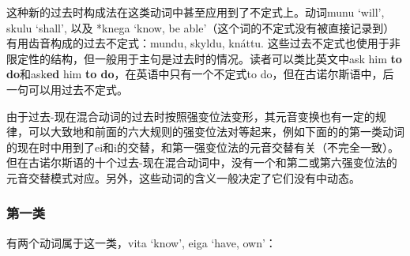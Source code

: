 这种新的过去时构成法在这类动词中甚至应用到了不定式上。动词munu `will‌', skulu `shall‌', 以及 *knega `know, be able‌'（这个词的不定式没有被直接记录到）有用齿音构成的过去不定式：mundu, skyldu, knáttu.
这些过去不定式也使用于非限定性的结构，但一般用于主句是过去时的情况。读者可以类比英文中ask him \textbf{to do}和ask\textbf{ed} him \textbf{to do}，在英语中只有一个不定式to do，但在古诺尔斯语中，后一句可以用过去不定式。

由于过去-现在混合动词的过去时按照强变位法变形，其元音变换也有一定的规律，可以大致地和前面的六大规则的强变位法对等起来，例如下面的的第一类动词的现在时中用到了ei和i的交替，和第一强变位法的元音交替有关（不完全一致）。但在古诺尔斯语的十个过去-现在混合动词中，没有一个和第二或第六强变位法的元音交替模式对应。另外，这些动词的含义一般决定了它们没有中动态。

\subsubsection{第一类}

有两个动词属于这一类，vita `know‌', eiga `have, own‌'：

